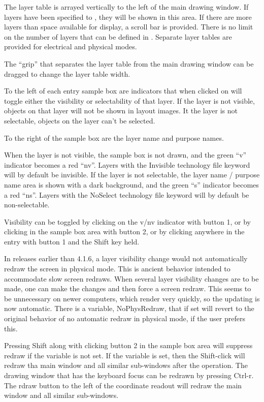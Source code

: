 The layer table is arrayed vertically to the left of the main drawing
window.  If layers have been specified to {\Xic}, they will be shown
in this area.  If there are more layers than space available for
display, a scroll bar is provided.  There is no limit on the number of
layers that can be defined in {\Xic}.  Separate layer tables are
provided for electrical and physical modes.

The ``grip'' that separates the layer table from the main drawing
window can be dragged to change the layer table width.

To the left of each entry sample box are indicators that when clicked
on will toggle either the visibility or selectability of that layer. 
If the layer is not visible, objects on that layer will not be shown
in layout images.  It the layer is not selectable, objects on the
layer can't be selected.

To the right of the sample box are the layer name and purpose names.

When the layer is not visible, the sample box is not drawn, and the
green ``{\vt v}'' indicator becomes a red ``{\vt nv}''.  Layers with
the {\vt Invisible} technology file keyword will by default be
invisible.  If the layer is not selectable, the layer name / purpose
name area is shown with a dark background, and the green ``{\vt s}''
indicator becomes a red ``{\vt ns}''.  Layers with the {\vt NoSelect}
technology file keyword will by default be non-selectable.

Visibility can be toggled by clicking on the {\vt v}/{\vt nv}
indicator with button 1, or by clicking in the sample box area with
button 2, or by clicking anywhere in the entry with button 1 and the
{\kb Shift} key held.

In releases earlier than 4.1.6, a layer visibility change would not
automatically redraw the screen in physical mode.  This is ancient
behavior intended to accommodate slow screen redraws.  When several
layer visibility changes are to be made, one can make the changes and
then force a screen redraw.  This seems to be unnecessary on newer
computers, which render very quickly, so the updating is now
automatic.  There is a variable, {\et NoPhysRedraw}, that if set will
revert to the original behavior of no automatic redraw in physical
mode, if the user prefers this.

Pressing {\kb Shift} along with clicking button 2 in the sample box
area will suppress redraw if the variable is not set.  If the variable
is set, then the {\kb Shift}-click will redraw tha main window and all
similar sub-windows after the operation.  The drawing window that has
the keyboard focus can be redrawn by pressing {\kb Ctrl-r}.  The {\cb
rdraw} button to the left of the coordinate readout will redraw the
main window and all similar sub-windows.

